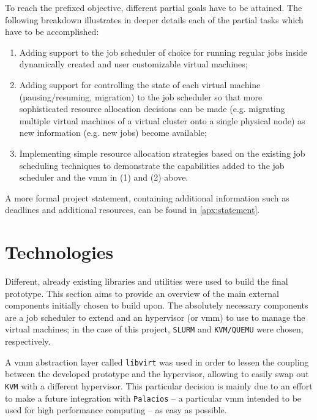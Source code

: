 To reach the prefixed objective, different partial goals have to be attained. The following breakdown illustrates in deeper details each of the partial tasks which have to be accomplished:

\begin{enumerate}
	\item Adding support to the job scheduler of choice for running regular jobs inside dynamically created and user customizable virtual machines;
	\item Adding support for controlling the state of each virtual machine (pausing/resuming, migration) to the job scheduler so that more sophisticated resource allocation decisions can be made (e.g. migrating multiple virtual machines of a virtual cluster onto a single physical node) as new information (e.g. new jobs) become available;
	\item Implementing simple resource allocation strategies based on the existing job scheduling techniques to demonstrate the capabilities added to the job scheduler and the \gls{vmm} in (1) and (2) above.
\end{enumerate}

A more formal project statement, containing additional information such as deadlines and additional resources, can be found in \autoref{apx:statement}.



\section{Technologies}
\label{sec:tech}

Different, already existing libraries and utilities were used to build the final prototype. This section aims to provide an overview of the main external components initially chosen to build upon. The absolutely necessary components are a job scheduler to extend and an hypervisor (or \gls{vmm}) to use to manage the virtual machines; in the case of this project, \texttt{SLURM} and \texttt{KVM/QUEMU} were chosen, respectively.

A \gls{vmm} abstraction layer called \texttt{libvirt} was used in order to lessen the coupling between the developed prototype and the hypervisor, allowing to easily swap out \texttt{KVM} with a different hypervisor. This particular decision is mainly due to an effort to make a future integration with \texttt{Palacios} -- a particular \gls{vmm} intended to be used for high performance computing -- as easy as possible.

